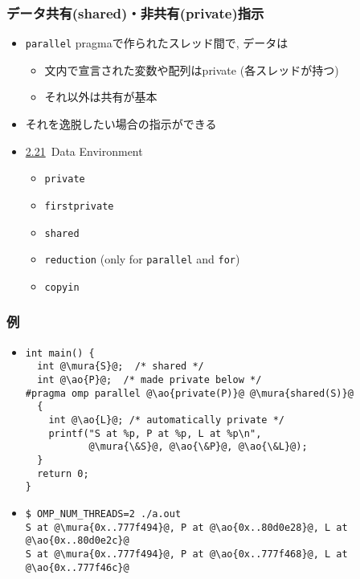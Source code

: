 \documentclass[10pt,dvipdfmx]{beamer}
\newcommand{\sectionompdataenv}{\href{https://www.openmp.org/spec-html/5.1/openmpse29.html\#x147-1590002.21}{2.21}}
\newcommand{\mura}[1]{{\color{purple}#1}}
\newcommand{\ao}[1]{{\color{blue}#1}}
\begin{document}

\begin{frame}
\frametitle{データ共有(shared)・非共有(private)指示}
\begin{itemize}
\item {\tt parallel} pragmaで作られたスレッド間で, データは
  \begin{itemize}
  \item 文内で宣言された変数や配列はprivate (各スレッドが持つ)
  \item それ以外は共有が基本
  \end{itemize}
  
\item それを逸脱したい場合の指示ができる

\item \sectionompdataenv\ Data Environment
  \begin{itemize}
  \item {\tt private}
  \item {\tt firstprivate}
  \item {\tt shared}
  \item {\tt reduction} (only for {\tt parallel} and {\tt for})
  \item {\tt copyin}
  \end{itemize}
\end{itemize}
\end{frame}

\begin{frame}[fragile]
\frametitle{例}
\begin{itemize}
\item []
\begin{lstlisting}
int main() {
  int @\mura{S}@;  /* shared */
  int @\ao{P}@;  /* made private below */
#pragma omp parallel @\ao{private(P)}@ @\mura{shared(S)}@
  {
    int @\ao{L}@; /* automatically private */
    printf("S at %p, P at %p, L at %p\n", 
           @\mura{\&S}@, @\ao{\&P}@, @\ao{\&L}@);
  }
  return 0;
}
\end{lstlisting}
\item []

{\small
\begin{lstlisting}
$ OMP_NUM_THREADS=2 ./a.out 
S at @\mura{0x..777f494}@, P at @\ao{0x..80d0e28}@, L at @\ao{0x..80d0e2c}@
S at @\mura{0x..777f494}@, P at @\ao{0x..777f468}@, L at @\ao{0x..777f46c}@
\end{lstlisting}}
\end{itemize}

\end{frame}
\end{document}
